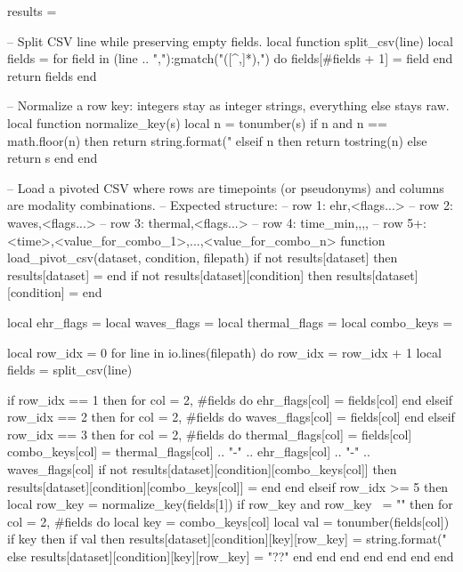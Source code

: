 \usepackage{luacode}

\begin{luacode*}
  results = {}

  -- Split CSV line while preserving empty fields.
  local function split_csv(line)
  local fields = {}
  for field in (line .. ","):gmatch("([^,]*),") do
  fields[#fields + 1] = field
  end
  return fields
  end

  -- Normalize a row key: integers stay as integer strings, everything else stays raw.
  local function normalize_key(s)
  local n = tonumber(s)
  if n and n == math.floor(n) then
  return string.format("%
    elseif n then
    return tostring(n)
    else
    return s
    end
    end

    -- Load a pivoted CSV where rows are timepoints (or pseudonyms) and columns are modality combinations.
    -- Expected structure:
    -- row 1: ehr,<flags...>
    -- row 2: waves,<flags...>
    -- row 3: thermal,<flags...>
    -- row 4: time_min,,,,
    -- row 5+: <time>,<value_for_combo_1>,...,<value_for_combo_n>
    function load_pivot_csv(dataset, condition, filepath)
    if not results[dataset] then results[dataset] = {} end
    if not results[dataset][condition] then results[dataset][condition] = {} end

    local ehr_flags = {}
    local waves_flags = {}
    local thermal_flags = {}
    local combo_keys = {}

    local row_idx = 0
    for line in io.lines(filepath) do
    row_idx = row_idx + 1
    local fields = split_csv(line)

    if row_idx == 1 then
    for col = 2, #fields do
    ehr_flags[col] = fields[col]
    end
    elseif row_idx == 2 then
    for col = 2, #fields do
    waves_flags[col] = fields[col]
    end
    elseif row_idx == 3 then
    for col = 2, #fields do
    thermal_flags[col] = fields[col]
    combo_keys[col] = thermal_flags[col] .. "-" .. ehr_flags[col] .. "-" .. waves_flags[col]
    if not results[dataset][condition][combo_keys[col]] then
    results[dataset][condition][combo_keys[col]] = {}
    end
    end
    elseif row_idx >= 5 then
    local row_key = normalize_key(fields[1])
    if row_key and row_key ~= "" then
    for col = 2, #fields do
    local key = combo_keys[col]
    local val = tonumber(fields[col])
    if key then
    if val then
    results[dataset][condition][key][row_key] = string.format("%
      else
      results[dataset][condition][key][row_key] = "??"
      end
      end
      end
      end
      end
      end
      end


\end{luacode*}
